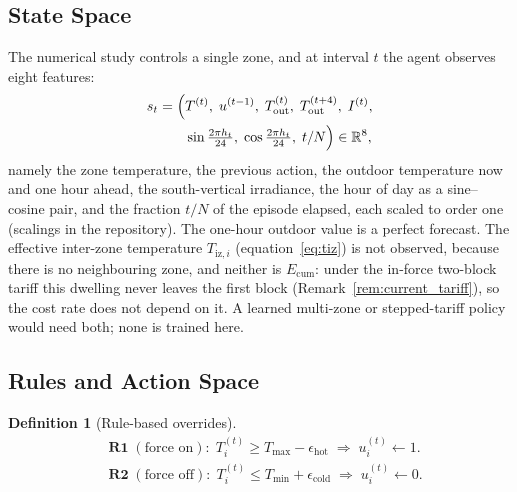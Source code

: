 \documentclass[3p,twocolumn,number]{elsarticle}
\newtheorem{definition}{Definition} \newtheorem{proposition}{Proposition} \newtheorem{remark}{Remark} \newtheorem{observation}{Observation} \newtheorem{corollary}{Corollary}
\newcommand{\Rset}{\mathbb{R}}
\newcommand{\Tmin}{T_{\min}}
\newcommand{\Tmax}{T_{\max}}
\newcommand{\Tout}{T_{\mathrm{out}}}
\newcommand{\Tiz}[1]{T_{\mathrm{iz},#1}}
\begin{document}
\subsection{State Space}
\label{subsec:state}
 
The numerical study controls a single zone, and at interval $t$ the agent observes eight features:
\begin{equation}
\begin{split}
  s_t=\Bigl(&T^{(t)},\;u^{(t-1)},\;\Tout^{(t)},\;\Tout^{(t+4)},\;I^{(t)},\\
  &\sin\tfrac{2\pi h_t}{24},\;\cos\tfrac{2\pi h_t}{24},\;t/N\Bigr)\in\Rset^{8},
\end{split}
  \label{eq:state}
\end{equation}
namely the zone temperature, the previous action, the outdoor temperature now and one hour ahead, the south-vertical irradiance, the hour of day as a sine--cosine pair, and the fraction $t/N$ of the episode elapsed, each scaled to order one (scalings in the repository). The one-hour outdoor value is a perfect forecast. The effective inter-zone temperature $\Tiz{i}$ (equation~\eqref{eq:tiz}) is not observed, because there is no neighbouring zone, and neither is $E_{\mathrm{cum}}$: under the in-force two-block tariff this dwelling never leaves the first block (Remark~\ref{rem:current_tariff}), so the cost rate does not depend on it. A learned multi-zone or stepped-tariff policy would need both; none is trained here.

\subsection{Rules and Action Space}
\label{subsec:rules}
 
\begin{definition}[Rule-based overrides]
\label{def:rules}
\begin{align}
  &\textbf{R1}\;(\text{force on}):\;
    T_i^{(t)}\ge\Tmax-\epsilon_{\mathrm{hot}}
    \;\Rightarrow\;u_i^{(t)}\leftarrow1. \label{eq:R1}\\
  &\textbf{R2}\;(\text{force off}):\;
    T_i^{(t)}\le\Tmin+\epsilon_{\mathrm{cold}}
    \;\Rightarrow\;u_i^{(t)}\leftarrow0. \label{eq:R2}
\end{align}
\end{definition}
\end{document}
